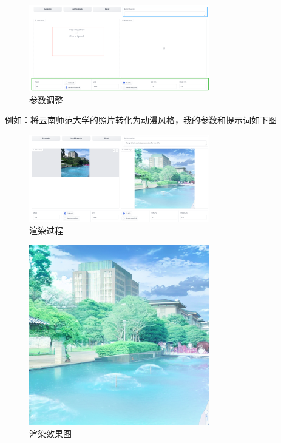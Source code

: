 \centering
\begin{figure}[H] %
  \centering %
  \includegraphics[width=0.7\textwidth]{assets/figures/image-20250211145347208.png} %
  \caption{参数调整} %
  \label{Fig.main1} %
\end{figure}%

例如：将云南师范大学的照片转化为动漫风格，我的参数和提示词如下图
\centering
\begin{figure}[H] %
  \centering %
  \includegraphics[width=0.7\textwidth]{assets/figures/9c6c2ff0409374eed093b8ec3447507.png} %
  \caption{渲染过程} %
  \label{Fig.main1} %
\end{figure}%

\centering
\begin{figure}[H] %
  \centering %
  \includegraphics[width=0.7\textwidth]{assets/figures/change.png} %
  \caption{渲染效果图} %
  \label{Fig.main1} %
\end{figure}%

